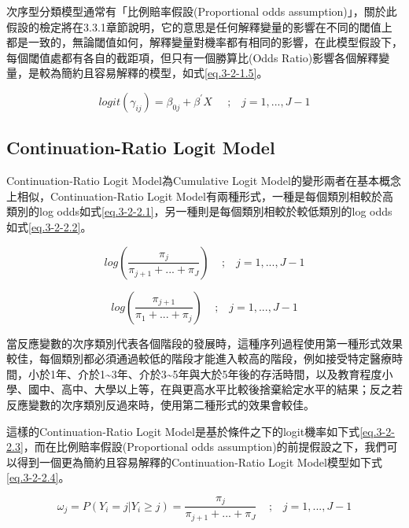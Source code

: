 	
	次序型分類模型通常有「比例賠率假設(Proportional odds assumption)」，關於此假設的檢定將在3.3.1章節說明，它的意思是任何解釋變量的影響在不同的閾值上都是一致的，無論閾值如何，解釋變量對機率都有相同的影響，在此模型假設下，每個閾值處都有各自的截距項，但只有一個勝算比(Odds Ratio)影響各個解釋變量，是較為簡約且容易解釋的模型，如式\ref{eq.3-2-1.5}。


\begin{equation}
\label{eq.3-2-1.5}
	logit(\gamma_{ij}) = \beta_{0j} + \beta^{'}X \;\;\;\;\;;\;\;\; j = 1,...,J-1
\end{equation}


\subsection{Continuation-Ratio Logit Model}

	Continuation-Ratio Logit Model為Cumulative Logit Model的變形兩者在基本概念上相似，Continuation-Ratio Logit Model有兩種形式，一種是每個類別相較於高類別的log odds如式\ref{eq.3-2-2.1}，另一種則是每個類別相較於較低類別的log odds如式\ref{eq.3-2-2.2}。

\begin{equation}
\label{eq.3-2-2.1}
	log(\frac{\pi_{j}}{\pi_{j+1} + ... + \pi_{J}}) \;\;\;\;;\;\;\; j = 1 ,..., J - 1
\end{equation}

\begin{equation}
\label{eq.3-2-2.2}
	log(\frac{\pi_{j+1}}{\pi_{1} + ... + \pi_{j}}) \;\;\;\;;\;\;\; j = 1 ,..., J - 1
\end{equation}

	當反應變數的次序類別代表各個階段的發展時，這種序列過程使用第一種形式效果較佳，每個類別都必須通過較低的階段才能進入較高的階段，例如接受特定醫療時間，小於1年、介於1\textasciitilde 3年、介於3\textasciitilde 5年與大於5年後的存活時間，以及教育程度小學、國中、高中、大學以上等，在與更高水平比較後捨棄給定水平的結果；反之若反應變數的次序類別反過來時，使用第二種形式的效果會較佳。

	這樣的Continuation-Ratio Logit Model是基於條件之下的logit機率如下式\ref{eq.3-2-2.3}，而在比例賠率假設(Proportional odds assumption)的前提假設之下，我們可以得到一個更為簡約且容易解釋的Continuation-Ratio Logit Model模型如下式\ref{eq.3-2-2.4}。
	
\begin{equation}
\label{eq.3-2-2.3}
	\omega_j = P(Y_i = j | Y_i \geq j) = \frac{\pi_j}{\pi_{j+1} + ... + \pi_{J}} \;\;\;\;;\;\;\; j = 1 ,..., J - 1
\end{equation}

